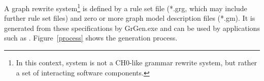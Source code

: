 
A graph rewrite system\footnote{In this context, system is not a CH0-like grammar rewrite system, but rather a set of interacting software components.} 
is defined by a rule set file (*.grg, which may include further rule set files) and zero or more graph model description files (*.gm). 
It is generated from these specifications by GrGen.exe and can be used by applications such as \GrShell.
Figure~\ref{process} shows the generation process.

